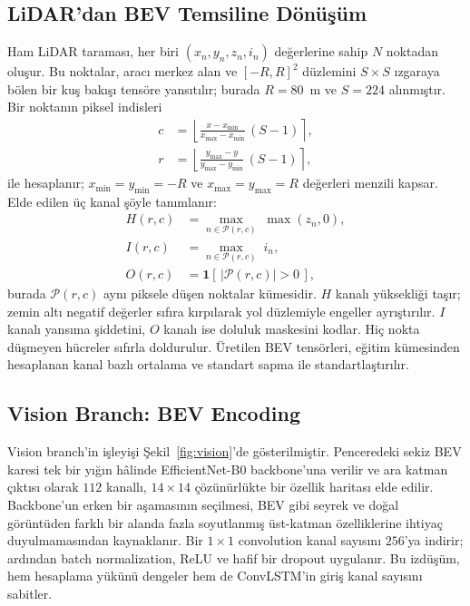 \documentclass[conference]{IEEEtran}
\begin{document}
\subsection{LiDAR'dan BEV Temsiline Dönüşüm}

Ham LiDAR taraması, her biri $(x_n, y_n, z_n, i_n)$ değerlerine sahip $N$ noktadan oluşur. Bu noktalar, aracı merkez alan ve $[-R, R]^2$ düzlemini $S\times S$ ızgaraya bölen bir kuş bakışı tensöre yansıtılır; burada $R=80$~m ve $S=224$ alınmıştır. Bir noktanın piksel indisleri
\begin{align}
c &= \left\lfloor \frac{x - x_{\min}}{x_{\max}-x_{\min}}\,(S-1) \right\rceil, \\
r &= \left\lfloor \frac{y_{\max}-y}{y_{\max}-y_{\min}}\,(S-1) \right\rceil,
\end{align}
ile hesaplanır; $x_{\min}=y_{\min}=-R$ ve $x_{\max}=y_{\max}=R$ değerleri menzili kapsar. Elde edilen üç kanal şöyle tanımlanır:
\begin{align}
H(r,c) &= \max_{n \in \mathcal{P}(r,c)} \; \max(z_n, 0), \\
I(r,c) &= \max_{n \in \mathcal{P}(r,c)} \; i_n, \\
O(r,c) &= \mathbf{1}\!\left[\,|\mathcal{P}(r,c)| > 0\,\right],
\end{align}
burada $\mathcal{P}(r,c)$ aynı piksele düşen noktalar kümesidir. $H$ kanalı yüksekliği taşır; zemin altı negatif değerler sıfıra kırpılarak yol düzlemiyle engeller ayrıştırılır. $I$ kanalı yansıma şiddetini, $O$ kanalı ise doluluk maskesini kodlar. Hiç nokta düşmeyen hücreler sıfırla doldurulur. Üretilen BEV tensörleri, eğitim kümesinden hesaplanan kanal bazlı ortalama ve standart sapma ile standartlaştırılır.

\subsection{Vision Branch: BEV Encoding}

Vision branch'in işleyişi Şekil~\ref{fig:vision}'de gösterilmiştir. Penceredeki sekiz BEV karesi tek bir yığın hâlinde EfficientNet-B0 backbone'una verilir ve ara katman çıktısı olarak $112$ kanallı, $14\times14$ çözünürlükte bir özellik haritası elde edilir. Backbone'un erken bir aşamasının seçilmesi, BEV gibi seyrek ve doğal görüntüden farklı bir alanda fazla soyutlanmış üst-katman özelliklerine ihtiyaç duyulmamasından kaynaklanır. Bir $1\times1$ convolution kanal sayısını $256$'ya indirir; ardından batch normalization, ReLU ve hafif bir dropout uygulanır. Bu izdüşüm, hem hesaplama yükünü dengeler hem de ConvLSTM'in giriş kanal sayısını sabitler.
\end{document}
